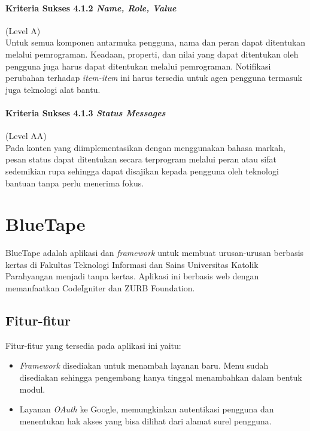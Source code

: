 \paragraph{Kriteria Sukses 4.1.2 \textit{Name, Role, Value}}
\label{sec:kriteria_sukses_4.1.2}
(Level A)\\

Untuk semua komponen antarmuka pengguna, nama dan peran dapat ditentukan melalui pemrograman. Keadaan, properti, dan nilai yang dapat ditentukan oleh pengguna juga harus dapat ditentukan melalui pemrograman. Notifikasi perubahan terhadap \textit{item-item} ini harus tersedia untuk agen pengguna termasuk juga teknologi alat bantu.

\paragraph{Kriteria Sukses 4.1.3 \textit{Status Messages}}
\label{sec:kriteria_sukses_4.1.3}
(Level AA)\\

Pada konten yang diimplementasikan dengan menggunakan bahasa markah, pesan status dapat ditentukan secara terprogram melalui peran atau sifat sedemikian rupa sehingga dapat disajikan kepada pengguna oleh teknologi bantuan tanpa perlu menerima fokus.



\section{BlueTape}
\label{sec:bluetape}
BlueTape adalah aplikasi dan \textit{framework} untuk membuat urusan-urusan berbasis kertas di Fakultas Teknologi Informasi dan Sains Universitas Katolik Parahyangan menjadi tanpa kertas. Aplikasi ini berbasis web dengan memanfaatkan CodeIgniter dan ZURB Foundation.

\subsection{Fitur-fitur}
\label{sec:bluetape_fitur}
Fitur-fitur yang tersedia pada aplikasi ini yaitu:
\begin{itemize}
	\item \textit{Framework} disediakan untuk menambah layanan baru. Menu sudah disediakan sehingga pengembang hanya tinggal menambahkan dalam bentuk modul.
	\item Layanan \textit{OAuth} ke Google, memungkinkan autentikasi pengguna dan menentukan hak akses yang bisa dilihat dari alamat surel pengguna.
\end{itemize}

